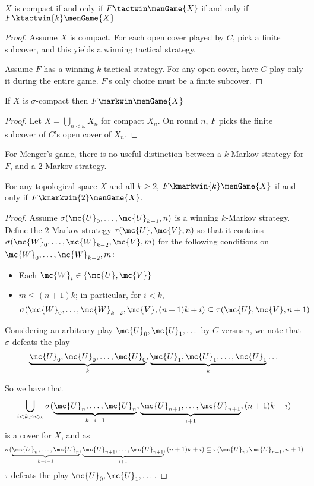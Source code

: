   \begin{prop}
    $X$ is compact if and only if $F \tactwin \menGame{X}$ if and only if $F \ktactwin{k} \menGame{X}$
  \end{prop}

  \begin{proof}
    Assume $X$ is compact. For each open cover played by $C$, pick a finite subcover, and this yields a winning tactical strategy.

    Assume $F$ has a winning $k$-tactical strategy. For any open cover, have $C$ play only it during the entire game. $F$'s only choice must be a finite subcover.
  \end{proof}

  \begin{prop}
    If $X$ is $\sigma$-compact then $F \markwin \menGame{X}$
  \end{prop}

  \begin{proof}
    Let $X=\bigcup_{n<\omega} X_n$ for compact $X_n$. On round $n$, $F$ picks the finite subcover of $C$'s open cover of $X_n$.
  \end{proof}

  For Menger's game, there is no useful distinction between a $k$-Markov strategy for $F$, and a $2$-Markov strategy.

  \begin{thm}
  For any topological space $X$ and all $k \geq 2$, $F \kmarkwin{k} \menGame{X}$ if and only if $F \kmarkwin{2} \menGame{X}$.
  \end{thm}

  \begin{proof}
  Assume $\sigma(\mc{U}_0,\dots,\mc{U}_{k-1},n)$ is a winning $k$-Markov strategy. Define the $2$-Markov strategy $\tau(\mc{U},\mc{V},n)$ so that it contains $\sigma(\mc{W}_0,\dots,\mc{W}_{k-2},\mc{V},m)$ for the following conditions on $\mc{W}_0,\dots,\mc{W}_{k-2},m$:
    \begin{itemize}
    \item Each $\mc{W}_i \in \{\mc{U},\mc{V}\}$
    \item $m \leq (n+1)k$; in particular, for $i<k$,
      \[
        \sigma(\mc{W}_0,\dots,\mc{W}_{k-2},\mc{V},(n+1)k+i)
        \subseteq
        \tau(\mc{U},\mc{V},n+1)
      \]
    \end{itemize}

  Considering an arbitrary play $\mc{U}_0, \mc{U}_1, \dots$ by $C$ versus $\tau$, we note that $\sigma$ defeats the play
  \[
    \underbrace{\mc{U}_0,\mc{U}_0,\dots,\mc{U}_0}_{k},
    \underbrace{\mc{U}_1,\mc{U}_1,\dots,\mc{U}_1}_{k}
    \dots
  \]

  So we have that
    \[
      \bigcup_{i<k, n<\omega} \sigma(
      \underbrace{\mc{U}_n,\dots,\mc{U}_n}_{k-i-1},
      \underbrace{\mc{U}_{n+1},\dots,\mc{U}_{n+1}}_{i+1},
      (n+1)k+i)
    \]
  is a cover for $X$, and as
    \[
      \sigma(
      \underbrace{\mc{U}_n,\dots,\mc{U}_n}_{k-i-1},
      \underbrace{\mc{U}_{n+1},\dots,\mc{U}_{n+1}}_{i+1},
      (n+1)k+i)
      \subseteq
      \tau(\mc{U}_n,\mc{U}_{n+1},n+1)
    \]
  $\tau$ defeats the play $\mc{U}_0, \mc{U}_1, \dots$.
  \end{proof}

